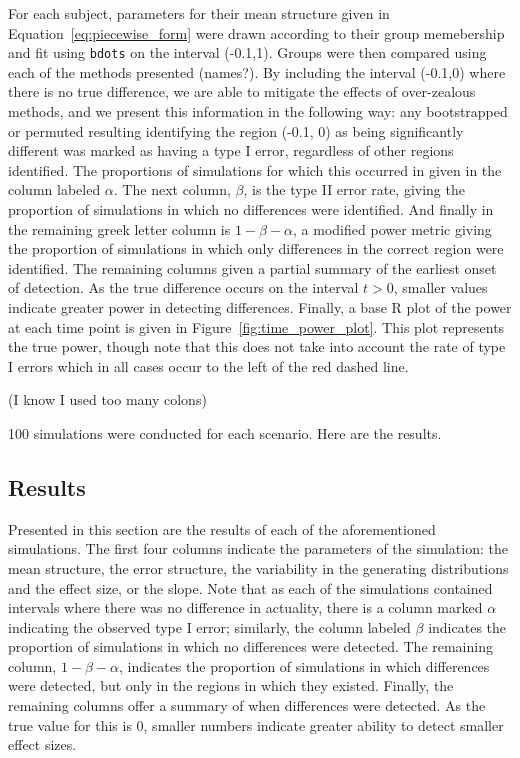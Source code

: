 \documentclass{article}
\newcommand{\xt}{\texttt}
\begin{document}
For each subject, parameters for their mean structure given in Equation~\ref{eq:piecewise_form} were drawn according to their group memebership and fit using \xt{bdots} on the interval (-0.1,1). Groups were then compared using each of the methods presented (names?). By including the interval (-0.1,0) where there is no true difference, we are able to mitigate the effects of over-zealous methods, and we present this information in the following way: any bootstrapped or permuted resulting identifying the region (-0.1, 0) as being significantly different was marked as having a type I error, regardless of other regions identified. The proportions of simulations for which this occurred in given in the column labeled $\alpha$. The next column, $\beta$, is the type II error rate, giving the proportion of simulations in which no differences were identified. And finally in the remaining greek letter column is   $1-\beta-\alpha$, a modified power metric giving the proportion of simulations in which only differences in the correct region were identified. The remaining columns given a partial summary of the earliest onset of detection. As the true difference occurs on the interval $t > 0$, smaller values indicate greater power in detecting differences. Finally, a base R plot of the power at each time point is given in Figure~\ref{fig:time_power_plot}. This plot represents the true power, though note that this does not take into account the rate of type I errors which in all cases occur to the left of the red dashed line.

(I know I used too many colons)

100 simulations were conducted for each scenario. Here are the results.


\subsection{Results}



Presented in this section are the results of each of the aforementioned simulations. The first four columns indicate the parameters of the simulation: the mean structure, the error structure, the variability in the generating distributions and the effect size, or the slope. Note that as each of the simulations contained intervals where there was no difference in actuality, there is a column marked $\alpha$ indicating the observed type I error; similarly, the column labeled $\beta$ indicates the proportion of simulations in which no differences were detected. The remaining column, $1 - \beta - \alpha$, indicates the proportion of simulations in which differences were detected, but only in the regions in which they existed. Finally, the remaining columns offer a summary of when differences were detected. As the true value for this is 0, smaller numbers indicate greater ability to detect smaller effect sizes.
\end{document}
